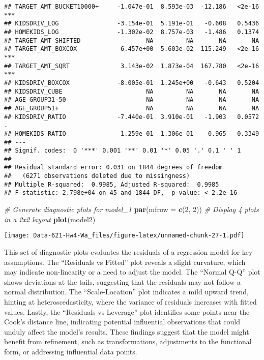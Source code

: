 \documentclass[
]{article}
\newenvironment{Shaded}{\begin{snugshade}}{\end{snugshade}}
\newcommand{\AttributeTok}[1]{\textcolor[rgb]{0.13,0.29,0.53}{#1}}
\newcommand{\CommentTok}[1]{\textcolor[rgb]{0.56,0.35,0.01}{\textit{#1}}}
\newcommand{\DecValTok}[1]{\textcolor[rgb]{0.00,0.00,0.81}{#1}}
\newcommand{\FunctionTok}[1]{\textcolor[rgb]{0.13,0.29,0.53}{\textbf{#1}}}
\newcommand{\NormalTok}[1]{#1}
\begin{document}
\begin{verbatim}
## TARGET_AMT_BUCKET10000+     -1.047e-01  8.593e-03  -12.186   <2e-16 ***
## KIDSDRIV_LOG                -3.154e-01  5.191e-01   -0.608   0.5436    
## HOMEKIDS_LOG                -1.302e-02  8.757e-03   -1.486   0.1374    
## TARGET_AMT_SHIFTED                  NA         NA       NA       NA    
## TARGET_AMT_BOXCOX            6.457e+00  5.603e-02  115.249   <2e-16 ***
## TARGET_AMT_SQRT              3.143e-02  1.873e-04  167.780   <2e-16 ***
## KIDSDRIV_BOXCOX             -8.005e-01  1.245e+00   -0.643   0.5204    
## KIDSDRIV_CUBE                       NA         NA       NA       NA    
## AGE_GROUP31-50                      NA         NA       NA       NA    
## AGE_GROUP51+                        NA         NA       NA       NA    
## KIDSDRIV_RATIO              -7.440e-01  3.910e-01   -1.903   0.0572 .  
## HOMEKIDS_RATIO              -1.259e-01  1.306e-01   -0.965   0.3349    
## ---
## Signif. codes:  0 '***' 0.001 '**' 0.01 '*' 0.05 '.' 0.1 ' ' 1
## 
## Residual standard error: 0.031 on 1844 degrees of freedom
##   (6271 observations deleted due to missingness)
## Multiple R-squared:  0.9985, Adjusted R-squared:  0.9985 
## F-statistic: 2.798e+04 on 45 and 1844 DF,  p-value: < 2.2e-16
\end{verbatim}

\begin{Shaded}
\begin{Highlighting}[]
\CommentTok{\# Generate diagnostic plots for model\_1}
\FunctionTok{par}\NormalTok{(}\AttributeTok{mfrow =} \FunctionTok{c}\NormalTok{(}\DecValTok{2}\NormalTok{, }\DecValTok{2}\NormalTok{))  }\CommentTok{\# Display 4 plots in a 2x2 layout}
\FunctionTok{plot}\NormalTok{(model2)}
\end{Highlighting}
\end{Shaded}

\texttt{[image: Data-621-Hw4-Wa\_files/figure-latex/unnamed-chunk-27-1.pdf]}

This set of diagnostic plots evaluates the residuals of a regression
model for key assumptions. The ``Residuals vs Fitted'' plot reveals a
slight curvature, which may indicate non-linearity or a need to adjust
the model. The ``Normal Q-Q'' plot shows deviations at the tails,
suggesting that the residuals may not follow a normal distribution. The
``Scale-Location'' plot indicates a mild upward trend, hinting at
heteroscedasticity, where the variance of residuals increases with
fitted values. Lastly, the ``Residuals vs Leverage'' plot identifies
some points near the Cook's distance line, indicating potential
influential observations that could unduly affect the model's results.
These findings suggest that the model might benefit from refinement,
such as transformations, adjustments to the functional form, or
addressing influential data points.
\end{document}
